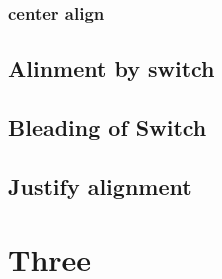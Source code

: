 \documentclass{book}
\begin{document}
	\subsection{center align}
		\begin{center}
			\lipsum[1]			
		\end{center}
		
	\section{Alinment by switch}
		\centering
			\lipsum[1]
			\lipsum[1]
	\section{Bleading of Switch}
		\lipsum[1]
		\justify
	\section{Justify alignment}
	    \lipsum[1]
	\chapter{Three}
		\lipsum[1]
		
\end{document}
